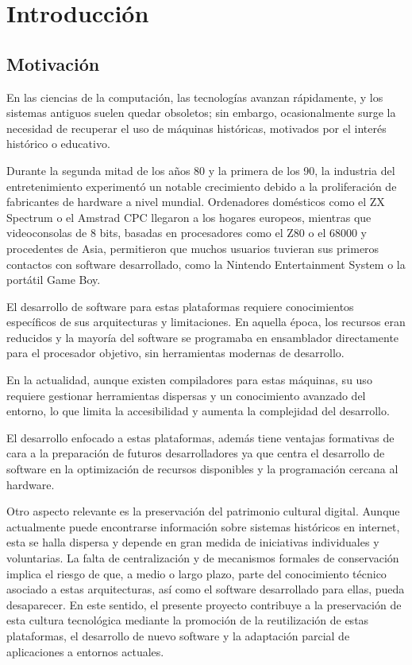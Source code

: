 \documentclass[../../main.tex]{subfiles}
\begin{document}
\chapter{Introducción}
\label{C:introduccion}

\section{Motivación}
\label{S:motivacion}

En las ciencias de la computación, las tecnologías avanzan rápidamente, y los sistemas antiguos suelen quedar obsoletos; sin embargo, ocasionalmente surge la necesidad de recuperar el uso de máquinas históricas, motivados por el interés histórico o educativo.

Durante la segunda mitad de los años 80 y la primera de los 90, la industria del entretenimiento experimentó un notable crecimiento debido a la proliferación de fabricantes de hardware a nivel mundial. Ordenadores domésticos como el ZX Spectrum o el Amstrad CPC llegaron a los hogares europeos, mientras que videoconsolas de 8 bits, basadas en procesadores como el Z80 o el 68000 y procedentes de Asia, permitieron que muchos usuarios tuvieran sus primeros contactos con software desarrollado, como la Nintendo Entertainment System o la portátil Game Boy.

El desarrollo de software para estas plataformas requiere conocimientos específicos de sus arquitecturas y limitaciones. En aquella época, los recursos eran reducidos y la mayoría del software se programaba en ensamblador directamente para el procesador objetivo, sin herramientas modernas de desarrollo.

En la actualidad, aunque existen compiladores para estas máquinas, su uso requiere gestionar herramientas dispersas y un conocimiento avanzado del entorno, lo que limita la accesibilidad y aumenta la complejidad del desarrollo.

El desarrollo enfocado a estas plataformas, además tiene ventajas formativas de cara a la preparación de futuros desarrolladores ya que centra el desarrollo de software en la optimización de recursos disponibles y la programación cercana al hardware.

Otro aspecto relevante es la preservación del patrimonio cultural digital. Aunque actualmente puede encontrarse información sobre sistemas históricos en internet, esta se halla dispersa y depende en gran medida de iniciativas individuales y voluntarias. La falta de centralización y de mecanismos formales de conservación implica el riesgo de que, a medio o largo plazo, parte del conocimiento técnico asociado a estas arquitecturas, así como el software desarrollado para ellas, pueda desaparecer. En este sentido, el presente proyecto contribuye a la preservación de esta cultura tecnológica mediante la promoción de la reutilización de estas plataformas, el desarrollo de nuevo software y la adaptación parcial de aplicaciones a entornos actuales.
\end{document}
